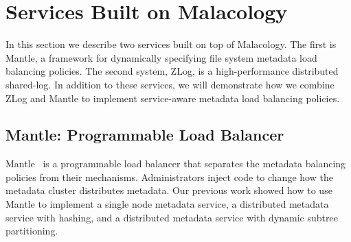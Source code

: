 \section{Services Built on Malacology}
\label{sec:services}
\label{services-built-on-malacology}

\label{services}

In this section we describe two services built on top of Malacology. The first
is Mantle, a framework for dynamically specifying file system metadata load balancing
policies. The second system, ZLog, is a high-performance distributed
shared-log.  In addition to these services, we will demonstrate how we combine
ZLog and Mantle to implement service-aware metadata load balancing policies.

\subsection{Mantle: Programmable Load Balancer}
\label{sec:mantle}

Mantle~\cite{sevilla:sc15-mantle} is a programmable load balancer that separates the metadata balancing
policies from their mechanisms. Administrators inject code to change how the
metadata cluster distributes metadata. Our previous work showed how 
to use Mantle to implement a single node metadata
service, a distributed metadata service with hashing, and a distributed
metadata service with dynamic subtree partitioning. 

